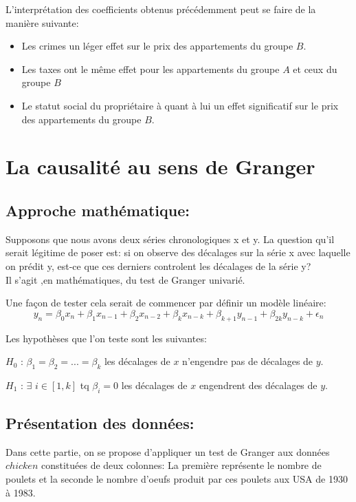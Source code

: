 \documentclass{article}
\begin{document}
L'interprétation des coefficients obtenus précédemment peut se faire de la manière suivante:
\begin{itemize}
    \item Les crimes un léger effet sur le prix des appartements du groupe $B$.
    \item Les taxes ont le même effet pour les appartements du groupe $A$ et ceux du groupe $B$
    \item Le statut social du propriétaire à quant à lui un effet significatif sur le prix des appartements du groupe $B$.
\end{itemize}

\section{La causalité au sens de Granger}
\subsection{Approche mathématique:}
Supposons que nous avons deux séries chronologiques x et y. La question qu'il serait légitime de poser est: si on observe des décalages sur la série x avec laquelle on prédit y, est-ce que ces derniers controlent les décalages de la série y? \\
Il s'agit ,en mathématiques, du test de Granger univarié.

Une façon de tester cela serait de commencer par définir un modèle linéaire:
\[y_n = \beta_0 x_n + \beta_1 x_{n-1} + \beta_2 x_{n-2} + \beta_k x_{n-k} + \beta_{k+1} y_{n-1} + \beta_{2k} y_{n-k} + \epsilon_n\]

Les hypothèses que l'on teste sont les suivantes:

$H_0$ : $\beta_1 = \beta_2 = ... = \beta_k$ les décalages de $x$ n'engendre pas de décalages de $y$.

$H_1$ : $\exists$  $i \in [1,k]$ tq $\beta_i = 0 $ les décalages de $x$ engendrent des décalages de $y$.

\subsection{Présentation des données:}
Dans cette partie, on se propose d'appliquer un test de Granger aux données $chicken$ constituées de deux colonnes: La première représente le nombre de poulets  et la seconde le nombre d'oeufs produit par ces poulets aux USA de 1930 à 1983.
\end{document}
